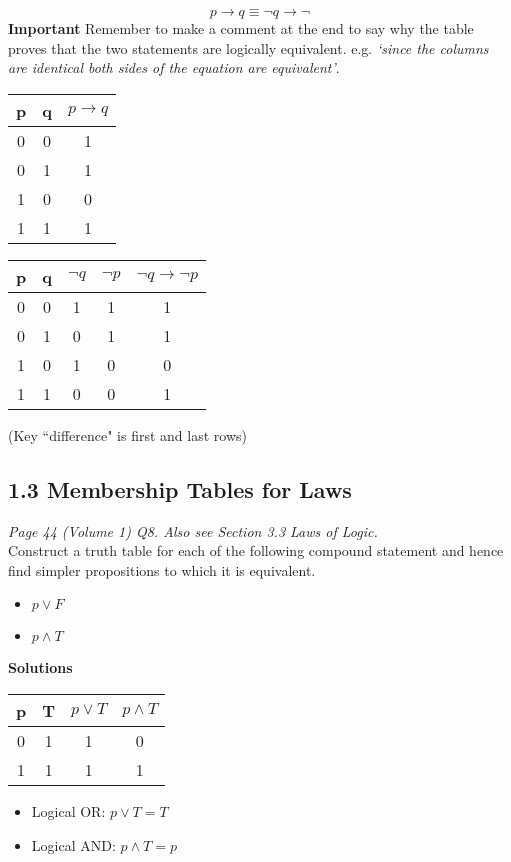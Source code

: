 \documentclass{article}
\begin{document}
\begin{center}
\[ p \rightarrow q \equiv \neg q \rightarrow \neg\]
\textbf{Important} Remember to make a comment at the end to say why the table proves that the two statements are logically equivalent. e.g. \emph{‘since the columns are identical both sides of the equation are equivalent’}.
{ \large
\begin{tabular}{|c|c||c|}
\hline  p&  q& $p \rightarrow q$ \\ 
\hline  0&  0&  1\\ 
\hline  0&  1&  1\\ 
\hline  1&  0&  0\\ 
\hline  1&  1&  1\\ 
\hline 
\end{tabular} \hspace{0.5cm} \begin{tabular}{|c|c||c|c|c|}
\hline  p&  q& $\neg q$ & $\neg p$ & $\neg q \rightarrow \neg p$ \\ 
\hline  0&  0& 1& 1& 1\\ 
\hline  0&  1& 0& 1& 1\\ 
\hline  1&  0& 1& 0& 0\\ 
\hline  1&  1& 0& 0& 1\\ 
\hline 
\end{tabular}
} 
(Key ``difference" is first and last rows)
\subsection*{1.3 Membership Tables for Laws}
\emph{Page 44 (Volume 1) Q8.
Also see Section 3.3 Laws of Logic.}\\

Construct a truth table for each of the following compound statement and hence find simpler propositions to which it is equivalent.


\begin{itemize}
\item $p \vee F$
\item $p \wedge T$
\end{itemize}
\textbf{Solutions}
\begin{center}
{\large
\begin{tabular}{|c|c||c|c|}
\hline  p & T & $p \vee T$ & $ p \wedge T$ \\ \hline
\hline  0 & 1 & 1 & 0 \\ 
\hline  1 &  1 & 1 & 1 \\ 
\hline 
\end{tabular} 
}
\end{center}
\begin{itemize}
\item Logical OR: $p \vee T = T $
\item Logical AND: $p \wedge T = p  $
\end{itemize}


\end{center}
\end{document}
